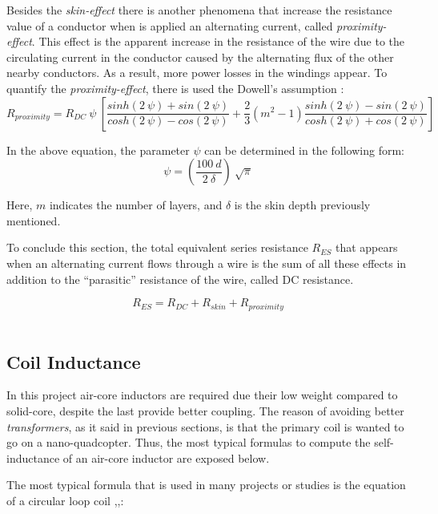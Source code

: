 Besides the \textit{skin-effect} there is another phenomena that increase the resistance value of a conductor when is applied an alternating current, called \textit{proximity-effect}. This effect is the apparent increase in the resistance of the wire due to the circulating current in the conductor caused by the alternating flux of the other nearby conductors. As a result, more power losses in the windings appear. To quantify the \textit{proximity-effect}, there is used the Dowell's assumption \cite{ACres}:
\begin{equation}
R_{proximity} = R_{DC}\:\psi\:\left [ \frac{sinh(2\:\psi)+sin(2\:\psi)}{cosh(2\:\psi)-cos(2\:\psi)}+\frac{2}{3}(m^2-1)\frac{sinh(2\:\psi)-sin(2\:\psi)}{cosh(2\:\psi)+cos(2\:\psi)} \right ]
\end{equation} 

In the above equation, the parameter $\psi$ can be determined in the following form:
\begin{equation*}
\psi = \left ( \frac{100\:d}{2\:\delta} \right )\:\sqrt{\pi}
\end{equation*}

Here, $m$ indicates the number of layers, and $\delta$ is the skin depth previously mentioned.

To conclude this section, the total equivalent series resistance $R_{ES}$ that appears when an alternating current flows through a wire is the sum of all these effects in addition to the ``parasitic'' resistance of the wire, called DC resistance. 

\begin{equation}\label{eq:Resistance}
R_{ES} = R_{DC}+R_{skin}+R_{proximity}
\end{equation} 

		\subsection{Coil Inductance}\label{subsec:coilInductance}
In this project air-core inductors are required due their low weight compared to solid-core, despite the last provide better coupling. The reason of avoiding better \textit{transformers}, as it said in previous sections, is that the primary coil is wanted to go on a nano-quadcopter. Thus, the most typical formulas to compute the self-inductance of an air-core inductor are exposed below.

The most typical formula that is used in many projects or studies is the equation of a circular loop coil \cite{TypicalL},\cite{UAV},\cite{Melliptical}:

